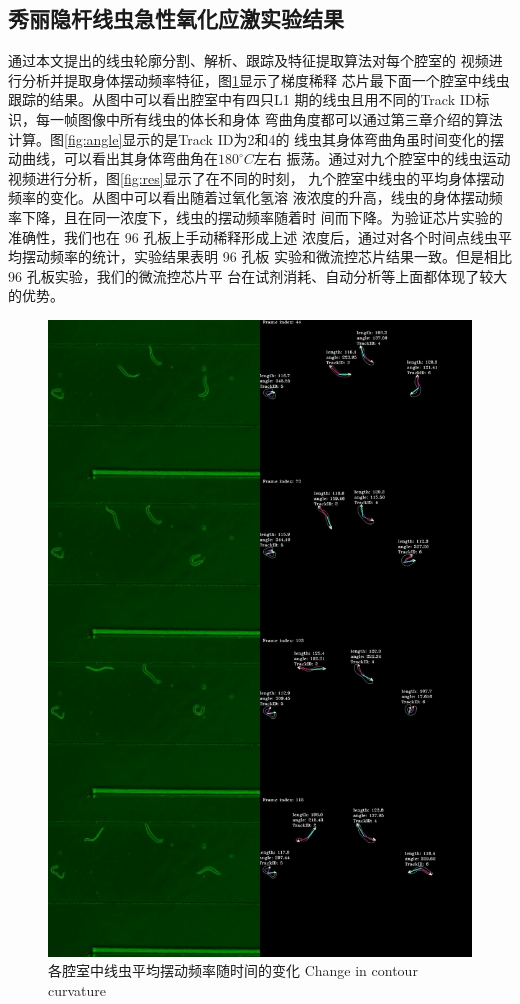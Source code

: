 \subsection{秀丽隐杆线虫急性氧化应激实验结果}
	通过本文提出的线虫轮廓分割、解析、跟踪及特征提取算法对每个腔室的
	视频进行分析并提取身体摆动频率特征，图\ref{fig:trackres}显示了梯度稀释
	芯片最下面一个腔室中线虫跟踪的结果。从图中可以看出腔室中有四只L1
	期的线虫且用不同的Track ID标识，每一帧图像中所有线虫的体长和身体
	弯曲角度都可以通过第三章介绍的算法计算。图\ref{fig:angle}显示的是Track ID为2和4的
	线虫其身体弯曲角虽时间变化的摆动曲线，可以看出其身体弯曲角在$180^\circ C$左右
	振荡。通过对九个腔室中的线虫运动视频进行分析，图\ref{fig:res}显示了在不同的时刻，
	九个腔室中线虫的平均身体摆动频率的变化。从图中可以看出随着过氧化氢溶
	液浓度的升高，线虫的身体摆动频率下降，且在同一浓度下，线虫的摆动频率随着时
	间而下降。为验证芯片实验的准确性，我们也在 96 孔板上手动稀释形成上述
	浓度后，通过对各个时间点线虫平均摆动频率的统计，实验结果表明 96 孔板
	实验和微流控芯片结果一致。但是相比 96 孔板实验，我们的微流控芯片平
	台在试剂消耗、自动分析等上面都体现了较大的优势。
	\begin{figure}[H]
	  \centering
	  \includegraphics[width=14cm]{figure/chap5/trackingres.jpg}
	  \bicaption
		{各腔室中线虫平均摆动频率随时间的变化}
		{Change in contour curvature}
	  \label{fig:trackres}
	\end{figure}
	
